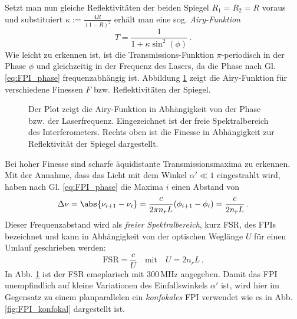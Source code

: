 Setzt man nun gleiche Reflektivitäten der beiden Spiegel $R_1=R_2=R$ voraus und
substituiert $\kappa:=\frac{4R}{(1-R)^2}$ erhält man eine sog.
\textit{Airy-Funktion}
\begin{equation}\label{eq:FPI_airy-funktion}
	T=\frac{1}{1+\kappa\sin^2{(\phi)}}\,.
\end{equation}
Wie leicht zu erkennen ist, ist die Transmissions-Funktion $\pi$-periodisch in
der Phase $\phi$ und gleichzeitig in der Frequenz des Lasers, da die Phase nach
Gl. \eqref{eq:FPI_phase} frequenzabhängig ist. Abbildung
\ref{fig:airy-funktion} zeigt die Airy-Funktion für verschiedene Finessen
$F$ bzw. Reflektivitäten der Spiegel.
\begin{figure}[h]
	\centering
	\footnotesize
	
	\caption[Airy-Funktion]{Der Plot zeigt die Airy-Funktion
	in Abhängigkeit von der Phase bzw.
	der Laserfrequenz. Eingezeichnet ist
	der freie Spektralbereich des
	Interferometers. Rechts oben ist die
	Finesse in Abhängigkeit zur
	Reflektivität der Spiegel dargestellt.}\label{fig:airy-funktion}
\end{figure}
Bei hoher Finesse sind scharfe
äquidistante Transmissionsmaxima zu erkennen. Mit der Annahme, dass das Licht
mit dem Winkel $\alpha'\ll1$ eingestrahlt wird, haben nach Gl.
\eqref{eq:FPI_phase} die Maxima $i$ einen Abstand von
\begin{equation}\label{eq:FPI_transmissionsmaxima}
	\Delta\nu=\abs{\nu_{i+1}-\nu_i}=\frac{c}{2\pi	n_rL}(\phi_{i+1}-\phi_i)=\frac{c}{2n_rL}\,.
\end{equation}
Dieser Frequenzabstand wird als \textit{freier Spektralbereich}, kurz FSR, des
FPIs bezeichnet und kann in Abhängigkeit von der optischen Weglänge $U$ für
einen Umlauf geschrieben werden:
\begin{equation}\label{eq:FPI_FSR_01}
	\text{FSR}=\frac{c}{U}
	\quad\text{mit}\quad
	U=2n_rL\,.
\end{equation}
In Abb. \ref{fig:airy-funktion} ist der FSR emeplarisch mit $300\,$MHz
angegeben. Damit das FPI unempfindlich auf kleine Variationen des Einfallswinkels $\alpha'$
ist, wird hier im Gegensatz zu einem planparallelen ein \textit{konfokales} FPI
verwendet wie es in Abb. \ref{fig:FPI_konfokal} dargestellt ist.
